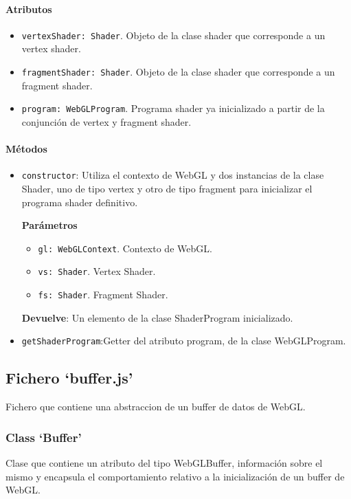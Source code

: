 \paragraph*{Atributos}
\begin{itemize}
    \item \verb|vertexShader: Shader|. Objeto de la clase shader que corresponde a un vertex shader.
    \item \verb|fragmentShader: Shader|. Objeto de la clase shader que corresponde a un fragment shader.
    \item \verb|program: WebGLProgram|. Programa shader ya inicializado a partir de la conjunción de vertex y fragment shader.
\end{itemize}

\paragraph*{Métodos}
\begin{itemize}
    \item \verb|constructor|: Utiliza el contexto de WebGL y dos instancias de la clase Shader, uno de tipo vertex y otro de tipo fragment para inicializar el programa shader definitivo.
    
    \textbf{Parámetros}
    \begin{itemize}
        \item \verb|gl: WebGLContext|. Contexto de WebGL.
        \item \verb|vs: Shader|. Vertex Shader.
        \item \verb|fs: Shader|. Fragment Shader.
    \end{itemize}
    \textbf{Devuelve}: Un elemento de la clase ShaderProgram inicializado.
    \item \verb|getShaderProgram|:Getter del atributo program, de la clase WebGLProgram.
\end{itemize}

\subsection{Fichero `buffer.js'}

Fichero que contiene una abstraccion de un buffer de datos de WebGL.

\subsubsection{Class `Buffer'}

Clase que contiene un atributo del tipo WebGLBuffer, información sobre el mismo y encapsula el comportamiento relativo a la inicialización de un buffer de WebGL. 

